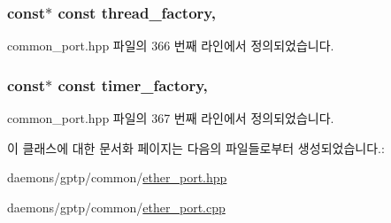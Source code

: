 \subsubsection[{\texorpdfstring{thread\+\_\+factory}{thread_factory}}]{ const$\ast$ const thread\+\_\+factory\hspace{0.3cm}{\ttfamily [protected]}, {\ttfamily [inherited]}}\hypertarget{class_common_port_a2268fc1f22a57c22f52a6cd1a2d2c609}{}\label{class_common_port_a2268fc1f22a57c22f52a6cd1a2d2c609}


common\+\_\+port.\+hpp 파일의 366 번째 라인에서 정의되었습니다.

\subsubsection[{\texorpdfstring{timer\+\_\+factory}{timer_factory}}]{ const$\ast$ const timer\+\_\+factory\hspace{0.3cm}{\ttfamily [protected]}, {\ttfamily [inherited]}}\hypertarget{class_common_port_a0603401af06940a9018688e0030e68e5}{}\label{class_common_port_a0603401af06940a9018688e0030e68e5}


common\+\_\+port.\+hpp 파일의 367 번째 라인에서 정의되었습니다.



이 클래스에 대한 문서화 페이지는 다음의 파일들로부터 생성되었습니다.\+:\begin{DoxyCompactItemize}
\item 
daemons/gptp/common/\hyperlink{ether__port_8hpp}{ether\+\_\+port.\+hpp}\item 
daemons/gptp/common/\hyperlink{ether__port_8cpp}{ether\+\_\+port.\+cpp}\end{DoxyCompactItemize}

